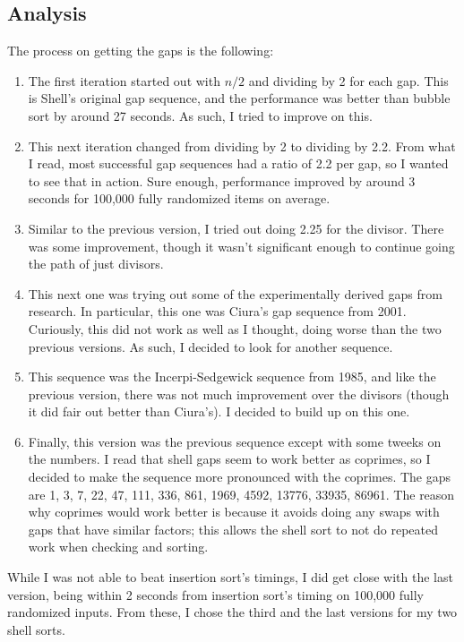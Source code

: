 \documentclass{article}
\begin{document}
\subsection{Analysis}
    The process on getting the gaps is the following:
    \begin{enumerate}
        \item The first iteration started out with $n/2$ and dividing by 2 for
            each gap. This is Shell's original gap sequence, and the performance
            was better than bubble sort by around 27 seconds. As such, I tried
            to improve on this.
        \item This next iteration changed from dividing by 2 to dividing by 2.2.
            From what I read, most successful gap sequences had a ratio of 2.2
            per gap, so I wanted to see that in action. Sure enough, performance
            improved by around 3 seconds for 100,000 fully randomized items on
            average.
        \item Similar to the previous version, I tried out doing 2.25 for the
            divisor. There was some improvement, though it wasn't significant
            enough to continue going the path of just divisors.
        \item This next one was trying out some of the experimentally derived
            gaps from research. In particular, this one was Ciura's gap sequence
            from 2001. Curiously, this did not work as well as I thought, 
            doing worse than the two previous versions. As such, I decided to
            look for another sequence.
        \item This sequence was the Incerpi-Sedgewick sequence from 1985, and 
            like the previous version, there was not much improvement over the
            divisors (though it did fair out better than Ciura's).
            I decided to build up on this one.
        \item Finally, this version was the previous sequence except with some
            tweeks on the numbers. I read that shell gaps seem to work better as 
            coprimes, so I decided to make the sequence more pronounced with the
            coprimes. The gaps are 1, 3, 7, 22, 47, 111, 336, 861, 1969, 4592, 
            13776, 33935, 86961. The reason why coprimes would work better is
            because it avoids doing any swaps with gaps that have similar
            factors; this allows the shell sort to not do repeated work when
            checking and sorting.
    \end{enumerate}
    \noindent While I was not able to beat insertion sort's timings, I did get
    close with the last version, being within 2 seconds from insertion sort's 
    timing on 100,000 fully randomized inputs. From these, I chose the third and
    the last versions for my two shell sorts.
\end{document}
